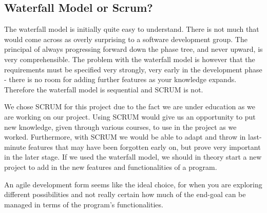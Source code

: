\subsection{Waterfall Model or Scrum?}


The waterfall model is initially quite easy to understand. There is not much that would come across as overly surprising to a software development group. The principal of always progressing forward down the phase tree, and never upward, is very comprehensible. The problem with the waterfall model is however that the requirements must be specified very strongly, very early in the development phase - there is no room for adding further features as your knowledge expands. Therefore the waterfall model is sequential and SCRUM is not\cite{waterfallexplained}. 


We chose SCRUM for this project due to the fact we are under education as we are working on our project. Using SCRUM would give us an opportunity to put new knowledge, given through various courses, to use in the project as we worked\cite{waterfallvsagile11}. Furthermore, with SCRUM we would be able to adapt and throw in last-minute features that may have been forgotten early on, but prove very important in the later stage. If we used the waterfall model, we should in theory start a new project to add in the new features and functionalities of a program\cite{waterfallexplained}. 


An agile development form seems like the ideal choice, for when you are exploring different possibilities and not really certain how much of the end-goal can be managed in terms of the program's functionalities\cite{waterfallvsagile11}.
